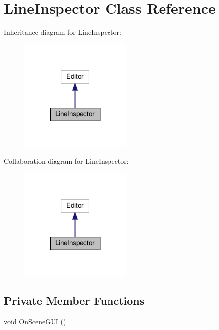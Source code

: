 \hypertarget{classLineInspector}{}\section{Line\+Inspector Class Reference}
\label{classLineInspector}


Inheritance diagram for Line\+Inspector\+:\nopagebreak
\begin{figure}[H]
\begin{center}
\leavevmode
\includegraphics[width=155pt]{classLineInspector__inherit__graph}
\end{center}
\end{figure}


Collaboration diagram for Line\+Inspector\+:\nopagebreak
\begin{figure}[H]
\begin{center}
\leavevmode
\includegraphics[width=155pt]{classLineInspector__coll__graph}
\end{center}
\end{figure}
\subsection*{Private Member Functions}
\begin{DoxyCompactItemize}
\item 
void \hyperlink{classLineInspector_a5d0b1541e2e3172637349afe61a1d1a3}{On\+Scene\+G\+UI} ()
\end{DoxyCompactItemize}


